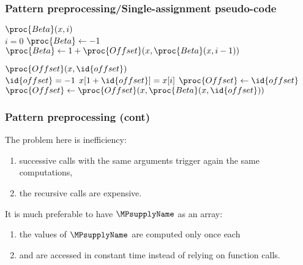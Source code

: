 %
\begin{frame}
\frametitle{Pattern preprocessing/Single-assignment pseudo-code}

\begin{codebox}
\(\proc{Beta} (x, i)\)\\
\li \If \(i = 0\)
\li \Then \(\proc{Beta} \gets -1\)
\li \Else \(\proc{Beta} \gets 1 + \proc{Offset} (x, \proc{Beta} (x,i-1))\)
    \End
\end{codebox}
\begin{codebox}
\(\proc{Offset}(x,\id{offset})\)\\
\li \If \(\id{offset} = -1\) \LogOr \(x[1+\id{offset}] = x[i]\)
\li \Then \(\proc{Offset} \gets \id{offset}\)
\li \Else \(\proc{Offset} \gets \proc{Offset} (x, \proc{Beta} (x,
            \id{offset}))\)
    \End
\end{codebox}

\end{frame}

%
\begin{frame}
\frametitle{Pattern preprocessing (cont)}

The problem here is inefficiency: 
\begin{enumerate}

  \item successive calls with the same arguments trigger again the
    same computations,

  \item the recursive calls are expensive.

\end{enumerate}
It is much preferable to have \(\MPsupplyName\) as an array:
\begin{enumerate}

  \item the values of \(\MPsupplyName\) are computed only once each

  \item and are accessed in constant time instead of relying on
    function calls.

\end{enumerate}

\end{frame}

